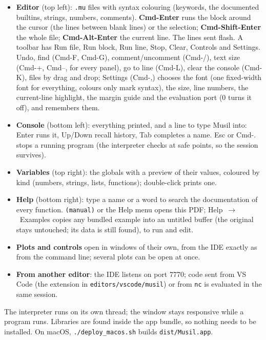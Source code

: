 \documentclass[11pt,a4paper]{article}
\newcommand{\musil}[1]{\lstinline[style=musilinline]{#1}}
\begin{document}
\begin{itemize}[nosep]
  \item \textbf{Editor} (top left): \texttt{.mu} files with syntax colouring (keywords,
        the documented builtins, strings, numbers, comments). \textbf{Cmd-Enter} runs the
        block around the cursor (the lines between blank lines) or the selection;
        \textbf{Cmd-Shift-Enter} the whole file; \textbf{Cmd-Alt-Enter} the current line.
        The lines sent flash. A toolbar has Run file, Run block, Run line, Stop, Clear,
        Controls and Settings. Undo, find (Cmd-F, Cmd-G), comment/uncomment (Cmd-/), text
        size (Cmd-+, Cmd--, for every panel), go to line (Cmd-L), clear the console (Cmd-K),
        files by drag and drop; Settings (Cmd-,) chooses the font (one fixed-width font for
        everything, colours only mark syntax), the size, line numbers, the current-line
        highlight, the margin guide and the evaluation port (0 turns it off), and remembers them.
  \item \textbf{Console} (bottom left): everything printed, and a line to type Musil into:
        Enter runs it, Up/Down recall history, Tab completes a name. Esc or Cmd-. stops a
        running program (the interpreter checks at safe points, so the session survives).
  \item \textbf{Variables} (top right): the globals with a preview of their values, coloured
        by kind (numbers, strings, lists, functions); double-click prints one.
  \item \textbf{Help} (bottom right): type a name or a word to search the documentation of
        every function. \musil{(manual)} or the Help menu opens this PDF; Help~$\to$~Examples
        copies any bundled example into an untitled buffer (the original stays untouched; its
        data is still found), to run and edit.
  \item \textbf{Plots and controls} open in windows of their own, from the IDE exactly as
        from the command line; several plots can be open at once.
  \item \textbf{From another editor}: the IDE listens on port 7770; code sent from VS Code
        (the extension in \texttt{editors/vscode/musil}) or from \texttt{nc} is evaluated in
        the same session.
\end{itemize}

The interpreter runs on its own thread; the window stays responsive while a program
runs. Libraries are found inside the app bundle, so nothing needs to be installed. On
macOS, \texttt{./deploy\_macos.sh} builds \texttt{dist/Musil.app}.
\end{document}
